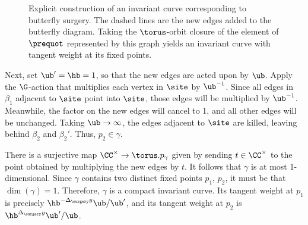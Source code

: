 \begin{figure}[t]
\vspace{-3mm}

\caption{Explicit construction of an invariant curve corresponding to butterfly surgery. The dashed lines are the new edges added to the butterfly diagram. Taking the $\torus$-orbit closure of the element of $\prequot$ represented by this graph yields an invariant curve with tangent weight  at its fixed points.} \label{fig:invariant_curve}
\vspace{-2mm}
\end{figure}

Next, set $\ub' = \hb = 1$, so that the new edges are acted upon by $\ub$. Apply the $\G$-action that multiplies each vertex in $\site$ by $\ub^{-1}$. Since all edges in $\beta_1$ adjacent to $\site$ point into $\site$, those edges will be multiplied by $\ub^{-1}$. Meanwhile, the factor on the new edges will cancel to 1, and all other edges will be unchanged. Taking $\ub \to \infty$, the edges adjacent to $\site$ are killed, leaving behind $\beta_2$ and $\beta_2'$. Thus, $p_2\in\gamma$.

There is a surjective map $\CC^\times \to \torus.p_\gamma$ given by sending $t\in\CC^\times$ to the point obtained by multiplying the new edges by $t$. It follows that $\gamma$ is at most 1-dimensional. Since $\gamma$ contains two distinct fixed points $p_1$, $p_2$, it must be that $\dim(\gamma) = 1$. Therefore, $\gamma$ is a compact invariant curve. Its tangent weight at $p_1$ is precisely $\hb^{-\Delta_\surgery y} \ub / \ub'$, and its tangent weight at $p_2$ is $\hb^{\Delta_\surgery y} \ub' / \ub$.

